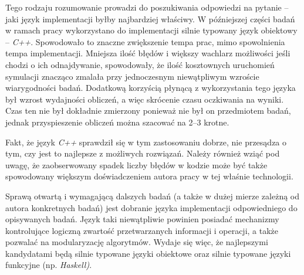 \documentclass[12pt,a4paper]{report}
\begin{document}
{{{{{{{{}
\par{
Tego rodzaju rozumowanie prowadzi do poszukiwania odpowiedzi na pytanie -- jaki język implementacji byłby najbardziej właściwy. W późniejszej części badań w ramach pracy wykorzystano do implementacji silnie typowany język obiektowy -- \emph{C++}. Spowodowało to znaczne zwiększenie tempa prac, mimo spowolnienia tempa implementacji. Mniejsza ilość błędów i większy wachlarz możliwości jeśli chodzi o ich odnajdywanie, spowodowały, że ilość kosztownych uruchomień symulacji znacząco zmalała przy jednoczesnym niewątpliwym wzroście wiarygodności badań. Dodatkową korzyścią płynącą z wykorzystania tego języka był wzrost wydajności obliczeń, a więc skrócenie czasu oczkiwania na wyniki. Czas ten nie był dokładnie zmierzony ponieważ nie był on przedmiotem badań, jednak przyspieszenie obliczeń można szacować na 2--3 krotne.
}
\par{
Fakt, że język \emph{C++} sprawdził się w tym zastosowaniu dobrze, nie przesądza o tym, czy jest to najlepsze z możliwych rozwiązań. Należy również wziąć pod uwagę, że zaobserwowany spadek liczby błędów w kodzie może być także spowodowany większym doświadczeniem autora pracy w tej właśnie technologii.
}
\par{
Sprawą otwartą i wymagającą dalszych badań (a także w dużej mierze zależną od autora konkretnych badań) jest dobranie języka implementacji odpowiedniego do opisywanych badań. Język taki niewątpliwie powinien posiadać mechanizmy kontrolujące logiczną zwartość przetwarzanych informacji i operacji, a także pozwalać na modularyzację algorytmów. Wydaje się więc, że najlepszymi kandydatami będą silnie typowane języki obiektowe oraz silnie typowane języki funkcyjne (np. \emph{Haskell)}.
}
}}}}}}}
\end{document}
